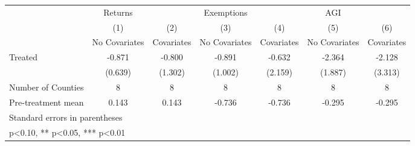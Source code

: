 {
\def\sym#1{\ifmmode^{#1}\else\(^{#1}\)\fi}
\begin{tabular}{l*{6}{c}}
\hline\hline
            &     Returns   &               &  Exemptions   &               &         AGI   &               \\
            &\multicolumn{1}{c}{(1)}&\multicolumn{1}{c}{(2)}&\multicolumn{1}{c}{(3)}&\multicolumn{1}{c}{(4)}&\multicolumn{1}{c}{(5)}&\multicolumn{1}{c}{(6)}\\
            &\multicolumn{1}{c}{No Covariates}&\multicolumn{1}{c}{Covariates}&\multicolumn{1}{c}{No Covariates}&\multicolumn{1}{c}{Covariates}&\multicolumn{1}{c}{No Covariates}&\multicolumn{1}{c}{Covariates}\\
\hline
Treated     &      -0.871   &      -0.800   &      -0.891   &      -0.632   &      -2.364   &      -2.128   \\
            &     (0.639)   &     (1.302)   &     (1.002)   &     (2.159)   &     (1.887)   &     (3.313)   \\
\hline
Number of Counties&           8   &           8   &           8   &           8   &           8   &           8   \\
Pre-treatment mean&       0.143   &       0.143   &      -0.736   &      -0.736   &      -0.295   &      -0.295   \\
\hline\hline
\multicolumn{7}{l}{\footnotesize Standard errors in parentheses}\\
\multicolumn{7}{l}{\footnotesize * p<0.10, ** p<0.05, *** p<0.01}\\
\end{tabular}
}
